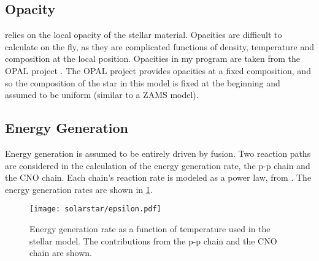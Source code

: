 \documentclass[10pt]{article}
\begin{document}
\subsection{Opacity} \label{sec:opacity}
 relies on the local opacity of the stellar material. Opacities are difficult to calculate on the fly, as they are complicated functions of density, temperature and composition at the local position. Opacities in my program are taken from the OPAL project \citep{1996ApJ...456..902R}. The OPAL project provides opacities at a fixed composition, and so the composition of the star in this model is fixed at the beginning and assumed to be uniform (similar to a ZAMS model).

\subsection{Energy Generation} \label{sec:fusion}
Energy generation is assumed to be entirely driven by fusion. Two reaction paths are considered in the calculation of the energy generation rate, the p-p chain and the CNO chain. Each chain's reaction rate is modeled as a power law, from \citet{Kippenhahn:1994tm}. The energy generation rates are shown in \cref{fig:energy}.

\begin{figure}[htbp]
   \centering
   \texttt{[image: solarstar/epsilon.pdf]}
   \caption[Energy Generation Rate]{Energy generation rate as a function of temperature used in the stellar model. The contributions from the p-p chain and the CNO chain are shown.}
   \label{fig:energy}
\end{figure}

\end{document}
